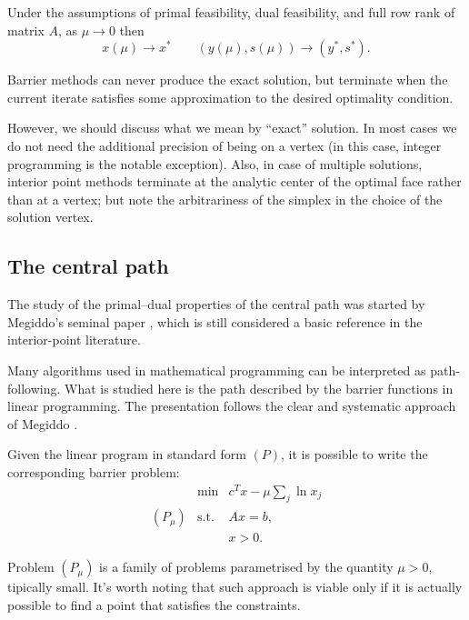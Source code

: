 \begin{lemma}
Under the assumptions of primal feasibility, dual feasibility, and
full row rank of matrix $A$, as $\mu \to 0$ then 
\[
   x(\mu) \to x^* \qquad (y(\mu),s(\mu)) \to (y^*, s^*).
\]
\end{lemma}

\hrulefill

Barrier methods can never produce the exact solution, but terminate
when the current iterate satisfies some approximation to the desired
optimality condition.

However, we should discuss what we mean by ``exact'' solution. In most
cases we do not need the additional precision of being on a vertex (in
this case, integer programming is the notable exception).
Also, in case of multiple solutions, interior point methods terminate
at the analytic center of the optimal face rather than at a vertex; 
but note the arbitrariness of the simplex in the choice of the solution
vertex.

%
%
\subsection{The central path}


The study of the primal--dual properties of the central path 
was started by Megiddo's seminal paper \cite{Megiddo}, which is 
still considered a basic reference in the interior-point literature.

Many algorithms used in mathematical programming can be interpreted 
as path-following. What is studied here is the path described by the 
barrier functions in linear programming.
The presentation follows the clear and systematic approach of Megiddo
\cite{Megiddo}.

Given the linear program in standard form $(P)$,
it is possible to write the corresponding barrier problem:
\[
\begin{array}{crl}
         & \min        & c^Tx - \mu \sum_j \ln x_j \\
 (P_\mu) & \mbox{s.t.} & Ax = b, \\
         &             & x > 0.
\end{array}
\]

Problem $(P_\mu)$ is a family of problems parametrised by the quantity $\mu>0$,
tipically small. 
It's worth noting that such approach is 
viable only if it is actually possible to find a point that 
satisfies the constraints.

